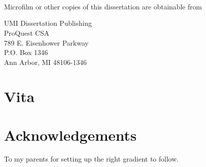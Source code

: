 \documentclass[12pt,letterpaper]{report}
\newcommand{\thesisdedication}{To my parents for setting up the right gradient to follow.}
\begin{document}
\noindent
\makebox[\textwidth]{\hfill\makebox[3in]{\hrulefill}}\\
\makebox[\textwidth]{\hfill\makebox[3in]{\rule[-4pt]{2in}{1pt}}}\\
\\

\doublespacing

\begin{center}
Microfilm or other copies of this dissertation are obtainable from
\vspace{4in}

UMI Dissertation Publishing\\
ProQuest CSA\\
789 E. Eisenhower Parkway\\
P.O. Box 1346\\
Ann Arbor, MI 48106-1346

\end{center}
\newpage

\section*{Vita}

\newpage



\section*{Acknowledgements}

\newpage

\vspace*{\fill}
\begin{center}
  \thesisdedication%
\end{center}
\vfill
\newpage


\end{document}
